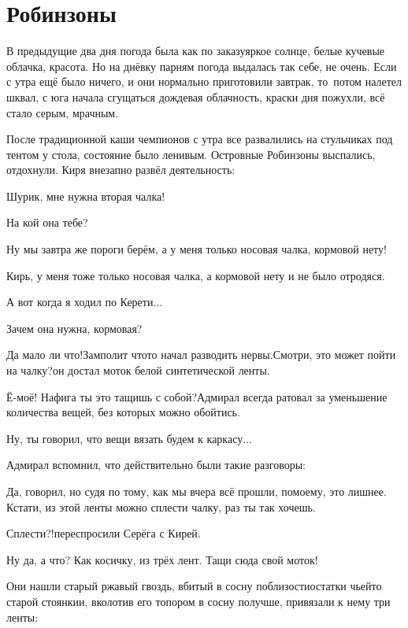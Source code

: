 \chapter{Робинзоны}
\vepsianrose

В предыдущие два дня погода была как по заказу\mdash яркое солнце, белые кучевые облачка, красота. Но на днёвку парням погода выдалась так себе, не очень. Если с утра ещё было ничего, и они нормально приготовили завтрак, то~потом налетел шквал, с юга начала сгущаться дождевая облачность, краски дня пожухли, всё стало серым, мрачным.

После традиционной каши чемпионов с утра все развалились на стульчиках под тентом у стола, состояние было ленивым. Островные Робинзоны выспались, отдохнули. Киря внезапно развёл деятельность:

\diagdash Шурик, мне нужна вторая чалка!

\diagdash На кой она тебе?

\diagdash Ну мы завтра же пороги берём, а у меня только носовая чалка, кормовой нету!

\diagdash Кирь, у меня тоже только носовая чалка, а кормовой нету и не было отродяся.

\diagdash А вот когда я ходил по Керети$\ldots$

\diagdash Зачем она нужна, кормовая?

\diagdash Да мало ли что!\mdash Замполит что\sdash то начал разводить нервы.\mdash Смотри, это может пойти на чалку?\mdash он достал моток белой синтетической ленты.

\diagdash Ё-моё! Нафига ты это тащишь с собой?\mdash Адмирал всегда ратовал за уменьшение количества вещей, без которых можно обойтись.

\diagdash Ну, ты говорил, что вещи вязать будем к каркасу$\ldots$

Адмирал вспомнил, что действительно были такие разговоры:

\diagdash Да, говорил, но судя по тому, как мы вчера всё прошли, по\sdash моему, это лишнее. Кстати, из этой ленты можно сплести чалку, раз ты так хочешь.

\diagdash Сплести?!\mdash переспросили Серёга с Кирей.

\diagdash Ну да, а что? Как косичку, из трёх лент. Тащи сюда свой моток!

Они нашли старый ржавый гвоздь, вбитый в сосну поблизости\mdash остатки чьей\sdash то старой стоянки\mdash и, вколотив его топором в сосну получше, привязали к нему три ленты:

